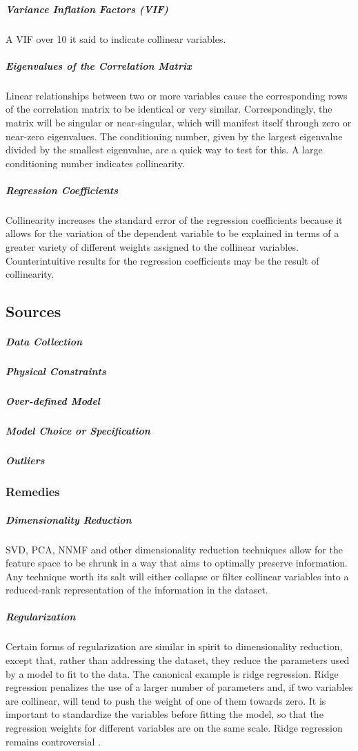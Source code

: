 \subparagraph{Variance Inflation Factors (VIF)}
A VIF over 10 it said to indicate collinear variables.

\subparagraph{Eigenvalues of the Correlation Matrix}
Linear relationships between two or more variables cause the corresponding rows of the correlation matrix to be identical or very similar. Correspondingly, the matrix will be singular or near-singular, which will manifest itself through zero or near-zero eigenvalues. The conditioning number, given by the largest eigenvalue divided by the smallest eigenvalue, are a quick way to test for this. A large conditioning number indicates collinearity.

\subparagraph{Regression Coefficients}
Collinearity increases the standard error of the regression coefficients because it allows for the variation of the dependent variable to be explained in terms of a greater variety of different weights assigned to the collinear variables. Counterintuitive results for the regression coefficients may be the result of collinearity. 

\subsection{Sources}

\subparagraph{Data Collection}
\subparagraph{Physical Constraints}
\subparagraph{Over-defined Model}
\subparagraph{Model Choice or Specification}
\subparagraph{Outliers}

\subsubsection{Remedies}

\subparagraph{Dimensionality Reduction}
SVD, PCA, NNMF and other dimensionality reduction techniques allow for the feature space to be shrunk in a way that aims to optimally preserve information. Any technique worth its salt will either collapse or filter collinear variables into a reduced-rank representation of the information in the dataset.

\subparagraph{Regularization}
Certain forms of regularization are similar in spirit to dimensionality reduction, except that, rather than addressing the dataset, they reduce the parameters used by a model to fit to the data. The canonical example is ridge regression. Ridge regression penalizes the use of a larger number of parameters and, if two variables are collinear, will tend to push the weight of one of them towards zero. It is important to standardize the variables before fitting the model, so that the regression weights for different variables are on the same scale. Ridge regression remains controversial \cite{ncssridgeregression}. 
